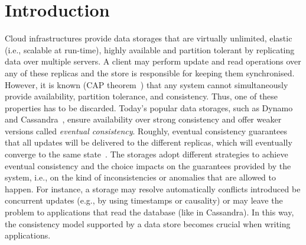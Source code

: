 
\section{Introduction}

Cloud infrastructures provide data storages that are virtually unlimited, elastic (i.e., scalable at run-time), 
highly available and partition tolerant by 
replicating data over multiple servers. A client may perform update and 
read operations over any of these replicas and the  store is responsible for keeping 
them synchronised. 
However, it is known (CAP theorem~\cite{CAP}) that any system cannot simultaneously provide availability, 
partition tolerance, and consistency. Thus, 
one of these properties has to be discarded. Today's popular 
data storages, such as Dynamo~\cite{DeCandia:2007:DAH:1294261.1294281} and  Cassandra~\cite{lakshman2010cassandra}, ensure 
availability over strong consistency and offer weaker versions called \emph{eventual consistency}.
Roughly, eventual consistency guarantees that all updates will be delivered to the different replicas, which will eventually converge to the same 
state~\cite{DBLP:journals/cacm/BailisG13}.
The  storages adopt different strategies to achieve eventual consistency and the choice  
impacts on the  guarantees provided by the system, i.e., on the kind of 
inconsistencies or anomalies that are allowed to happen. For instance, a storage may
resolve automatically conflicts introduced be concurrent updates (e.g., by using timestamps or causality) or  
may leave the problem to applications that read the database (like in Cassandra).
In this way, the consistency model supported by a data store becomes crucial when writing applications. 

